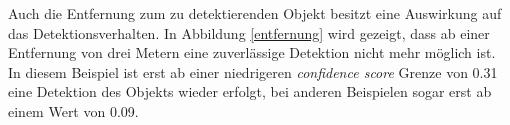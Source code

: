 Auch die Entfernung zum zu detektierenden Objekt besitzt eine Auswirkung auf das Detektionsverhalten. In Abbildung \ref{entfernung} wird gezeigt, dass ab einer Entfernung von drei Metern eine zuverlässige Detektion nicht mehr möglich ist. In diesem Beispiel ist erst ab einer niedrigeren \textit{confidence score} Grenze von 0.31 eine Detektion des Objekts wieder erfolgt, bei anderen Beispielen sogar erst ab einem Wert von 0.09.

\begin{figure}[H]
	\hfill
	\hfill
	\hfill
	\hfill

\end{figure}
